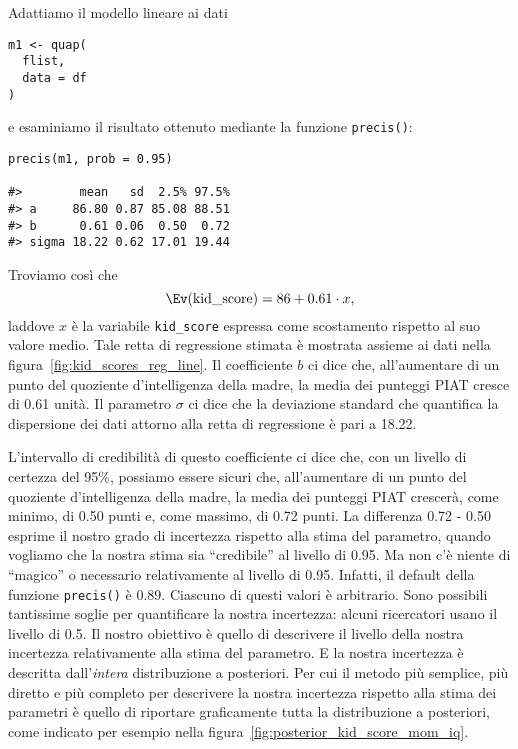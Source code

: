 Adattiamo il modello lineare ai dati




\begin{lstlisting}
m1 <- quap(
  flist,
  data = df
)
\end{lstlisting}
\noindent
e esaminiamo il risultato ottenuto mediante la funzione \verb+precis()+:
\begin{lstlisting}
precis(m1, prob = 0.95)

#>        mean   sd  2.5% 97.5%
#> a     86.80 0.87 85.08 88.51
#> b      0.61 0.06  0.50  0.72
#> sigma 18.22 0.62 17.01 19.44
\end{lstlisting}
 


Troviamo così che 
\[
\Ev (\text{kid\_score}) = 86 + 0.61 \cdot x,
\]
laddove $x$ è la variabile \verb+kid_score+ espressa come scostamento rispetto al suo valore medio. 
Tale retta di regressione stimata è mostrata assieme ai dati  nella figura~\ref{fig:kid_scores_reg_line}.
Il coefficiente $b$ ci dice che, all'aumentare di un punto del quoziente d'intelligenza della madre, la media dei punteggi PIAT cresce di 0.61 unità.
Il parametro $\sigma$ ci dice che la deviazione standard che quantifica la dispersione dei dati attorno alla retta di regressione è pari a 18.22.

L'intervallo di credibilità di questo coefficiente ci dice che, con un livello di certezza del 95\%, possiamo essere sicuri che, all'aumentare di un punto del quoziente d'intelligenza della madre, la media dei punteggi PIAT crescerà, come minimo, di 0.50 punti e, come massimo, di 0.72 punti.
La differenza 0.72 - 0.50 esprime il nostro grado di incertezza rispetto alla stima del parametro, quando vogliamo che la nostra stima sia \enquote{credibile} al livello di 0.95. 
Ma non c'è niente di \enquote{magico} o necessario relativamente al livello di 0.95.
Infatti, il default della funzione \verb+precis()+ è 0.89.
Ciascuno di questi valori è arbitrario.
Sono possibili tantissime soglie per quantificare la nostra incertezza: alcuni ricercatori usano il livello di 0.5.
Il nostro obiettivo è quello di descrivere il livello della nostra incertezza relativamente alla stima del parametro.
E la nostra incertezza è descritta dall'\emph{intera} distribuzione a posteriori.
Per cui il metodo più semplice, più diretto e più completo per descrivere la nostra incertezza rispetto alla stima dei parametri è quello di riportare graficamente tutta la distribuzione a posteriori, come indicato per esempio nella figura~\ref{fig:posterior_kid_score_mom_iq}.

